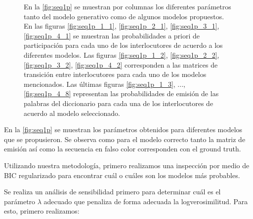 \clearpage

\begin{figure}
\captionsetup{labelformat=adja-page}
\ContinuedFloat
\caption{ En la \autoref{fig:seq1p} se muestran por columnas los diferentes parámetros tanto del modelo generativo como de algunos modelos propuestos. 
En las figuras \autoref{fig:seq1p_1_1}, \autoref{fig:seq1p_2_1}, \autoref{fig:seq1p_3_1}, \autoref{fig:seq1p_4_1} se muestran las probabilidades a priori de participación para cada uno de los interlocutores de acuerdo a los diferentes modelos. 
Las figuras \autoref{fig:seq1p_1_2}, \autoref{fig:seq1p_2_2}, \autoref{fig:seq1p_3_2}, \autoref{fig:seq1p_4_2} corresponden a las matrices de transición entre interlocutores para cada uno de los modelos mencionados.
Las últimas figuras \autoref{fig:seq1p_1_3}, ..., \autoref{fig:seq1p_4_8} representan las probabilidades de emisión de las palabras del diccionario para cada una de los interlocutores de acuerdo al modelo seleccionado.
 }

\end{figure}

En la \autoref{fig:seq1p} se muestran los parámetros obtenidos para diferentes modelos que se propusieron. Se observa como para el modelo correcto tanto la matriz de emisión así como la secuencia en falso color corresponden con el ground truth.

Utilizando nuestra metodología, primero realizamos una inspección por medio de BIC regularizado para encontrar cuál o cuáles son los modelos más probables. 

Se realiza un análisis de sensibilidad primero para determinar cuál es el parámetro $\lambda$ adecuado que penaliza de forma adecuada la logverosimilitud. Para esto, primero realizamos: 

